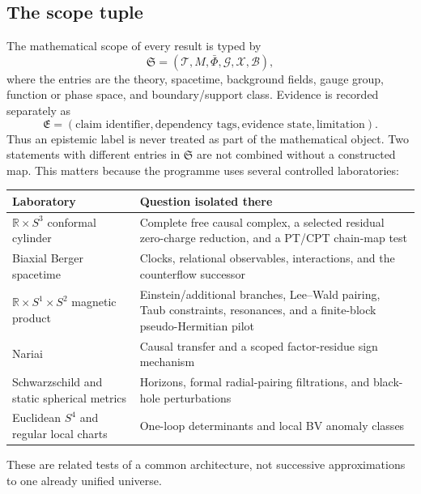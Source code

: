 \documentclass[11pt]{article}
\newcommand{\R}{\mathbb R}
\begin{document}
\subsection{The scope tuple}

The mathematical scope of every result is typed by
\begin{equation}
 \boxed{\mathfrak S=(\mathcal T,M,\bar\Phi,\mathcal G,
                     \mathcal X,\mathcal B),}
 \label{eq:scope-tuple}
\end{equation}
where the entries are the theory, spacetime, background fields, gauge group,
function or phase space, and boundary/support class.  Evidence is recorded
separately as
\begin{equation}
 \mathfrak E=(\text{claim identifier},\text{dependency tags},
              \text{evidence state},\text{limitation}).
 \label{eq:evidence-tuple}
\end{equation}
Thus an epistemic label is never treated as part of the mathematical object.
Two statements with different entries in $\mathfrak S$ are not combined
without a constructed map.  This matters because the programme uses several
controlled laboratories:
\begin{center}
\begin{tabularx}{\textwidth}{@{}lY@{}}
\toprule
Laboratory & Question isolated there \\
\midrule
$\R\times S^3$ conformal cylinder & Complete free causal complex, a selected
residual zero-charge reduction, and a PT/CPT chain-map test \\
Biaxial Berger spacetime & Clocks, relational observables, interactions, and
the counterflow successor \\
$\R\times S^1\times S^2$ magnetic product & Einstein/additional branches,
Lee--Wald pairing, Taub constraints, resonances, and a finite-block
pseudo-Hermitian pilot \\
Nariai & Causal transfer and a scoped factor-residue sign mechanism \\
Schwarzschild and static spherical metrics & Horizons, formal radial-pairing
filtrations, and black-hole perturbations \\
Euclidean $S^4$ and regular local charts & One-loop determinants and local BV
anomaly classes \\
\bottomrule
\end{tabularx}
\end{center}
These are related tests of a common architecture, not successive
approximations to one already unified universe.
\end{document}
